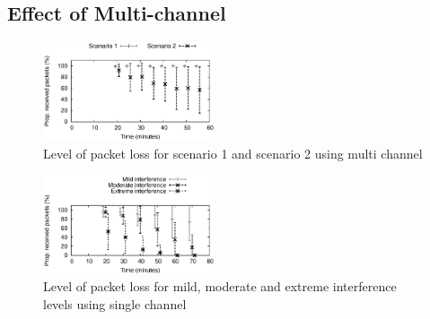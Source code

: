 

\subsection{Effect of Multi-channel}

\begin{figure}
\centering
\includegraphics[width=0.45\textwidth]{experiments/multi_channel.eps}
\caption{Level of packet loss for scenario 1 and scenario 2 using multi channel}
\label{fig:multi_interference}
\end{figure}

\begin{figure}
\centering
\includegraphics[width=0.45\textwidth]{experiments/single_channel.eps}
\caption{Level of packet loss for mild, moderate and extreme interference levels using single channel}

\label{fig:interference}
\end{figure}

